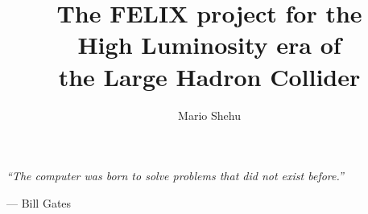 \documentclass{styles/tthesis}
\title{The FELIX project for the \\High Luminosity era of \\the Large Hadron Collider}
\author{Mario Shehu}
\begin{document}


\printfrontpage




\chapter*{\mbox{}}

\begin{flushright}
\thispagestyle{empty}
\null{}
{\it “The computer was born to solve problems that did not exist before.”

\vspace{10pt}
— Bill Gates
}
\null
\end{flushright}
%
\thispagestyle{empty}
\mbox{}
\newpage





\tableofcontents
\listoffigures
\listoftables

\mainmatter

% 
% 
% 
% 
% 
% 
% 










\appendix



\printbibliography
\end{document}
